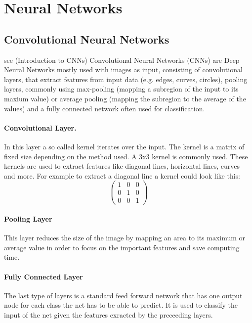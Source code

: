 \section{Neural Networks}

\subsection{Convolutional Neural Networks}
see \cite{wu2017introduction} (Introduction to CNNs)
Convolutional Neural Networks (CNNs) are Deep Neural Networks mostly used with images as input, consisting of convolutional layers, that extract features from input data (e.g. edges, curves, circles), pooling layers, commonly using max-pooling (mapping a subregion of the input to its maxium value) or average pooling (mapping the subregion to the average of the values) and a fully connected network often used for classification. 

\paragraph{Convolutional Layer.}
In this layer a so called kernel iterates over the input. The kernel is a matrix of fixed size depending on the method used. A 3x3 kernel is commonly used. These kernels are used to extract features like diagonal lines, horizontal lines, curves and more. For example to extract a diagonal line a kernel could look like this:
$$
\begin{pmatrix}
	1 & 0 & 0\\
	0 & 1 & 0\\
	0 & 0 & 1
\end{pmatrix}
$$

\paragraph{Pooling Layer}
This layer reduces the size of the image by mapping an area to its maximum or average value in order to focus on the important features and save computing time.


\paragraph{Fully Connected Layer}
The last type of layers is a standard feed forward network that has one output node for each class the net has to be able to predict. It is used to classify the input of the net given the features exracted by the preceeding layers. 



